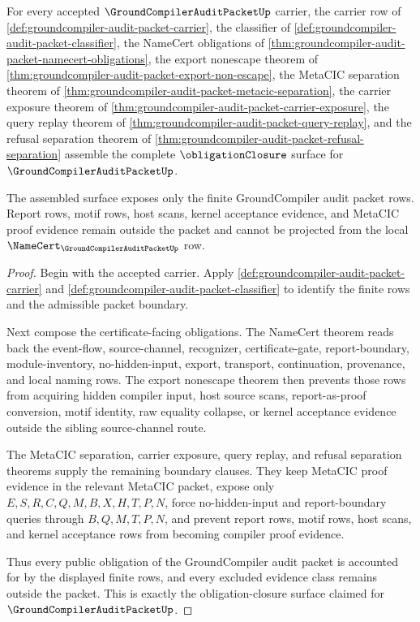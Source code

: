 \begin{theorem}
\label{thm:groundcompiler-audit-packet-obligation-closure}
For every accepted $\GroundCompilerAuditPacketUp$ carrier, the carrier row of \autoref{def:groundcompiler-audit-packet-carrier}, the classifier of \autoref{def:groundcompiler-audit-packet-classifier}, the NameCert obligations of \autoref{thm:groundcompiler-audit-packet-namecert-obligations}, the export nonescape theorem of \autoref{thm:groundcompiler-audit-packet-export-non-escape}, the MetaCIC separation theorem of \autoref{thm:groundcompiler-audit-packet-metacic-separation}, the carrier exposure theorem of \autoref{thm:groundcompiler-audit-packet-carrier-exposure}, the query replay theorem of \autoref{thm:groundcompiler-audit-packet-query-replay}, and the refusal separation theorem of \autoref{thm:groundcompiler-audit-packet-refusal-separation} assemble the complete $\obligationClosure$ surface for $\GroundCompilerAuditPacketUp$.

The assembled surface exposes only the finite GroundCompiler audit packet rows. Report rows, motif rows, host scans, kernel acceptance evidence, and MetaCIC proof evidence remain outside the packet and cannot be projected from the local $\NameCert_{\GroundCompilerAuditPacketUp}$ row.
\end{theorem}
\begin{proof}
Begin with the accepted carrier. Apply \autoref{def:groundcompiler-audit-packet-carrier} and \autoref{def:groundcompiler-audit-packet-classifier} to identify the finite rows and the admissible packet boundary.

Next compose the certificate-facing obligations. The NameCert theorem reads back the event-flow, source-channel, recognizer, certificate-gate, report-boundary, module-inventory, no-hidden-input, export, transport, continuation, provenance, and local naming rows. The export nonescape theorem then prevents those rows from acquiring hidden compiler input, host source scans, report-as-proof conversion, motif identity, raw equality collapse, or kernel acceptance evidence outside the sibling source-channel route.

The MetaCIC separation, carrier exposure, query replay, and refusal separation theorems supply the remaining boundary clauses. They keep MetaCIC proof evidence in the relevant MetaCIC packet, expose only $E,S,R,C,Q,M,B,X,H,T,P,N$, force no-hidden-input and report-boundary queries through $B,Q,M,T,P,N$, and prevent report rows, motif rows, host scans, and kernel acceptance rows from becoming compiler proof evidence.

Thus every public obligation of the GroundCompiler audit packet is accounted for by the displayed finite rows, and every excluded evidence class remains outside the packet. This is exactly the obligation-closure surface claimed for $\GroundCompilerAuditPacketUp$.
\end{proof}

